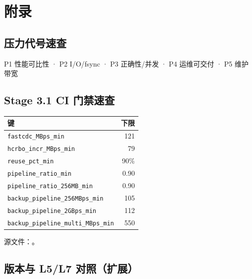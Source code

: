 \chapter{附录}

\section{压力代号速查}

P1 性能可比性 · P2 I/O/fsync · P3 正确性/并发 · P4 运维可交付 · P5 维护带宽

\section{Stage 3.1 CI 门禁速查}

\begin{table}[htbp]
\centering
\small
\begin{tabular}{@{}lr@{}}
\toprule
键 & 下限 \\
\midrule
\texttt{fastcdc\_MBps\_min} & 121 \\
\texttt{hcrbo\_incr\_MBps\_min} & 79 \\
\texttt{reuse\_pct\_min} & 90\% \\
\texttt{pipeline\_ratio\_min} & 0.90 \\
\texttt{pipeline\_ratio\_256MB\_min} & 0.90 \\
\texttt{backup\_pipeline\_256MBps\_min} & 105 \\
\texttt{backup\_pipeline\_2GBps\_min} & 112 \\
\texttt{backup\_pipeline\_multi\_MBps\_min} & 550 \\
\bottomrule
\end{tabular}
\end{table}

源文件：。

\section{版本与 L5/L7 对照（扩展）}

